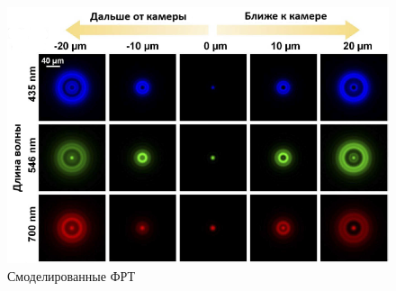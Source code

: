 \begin{figure}[ht] 
	\center
	\includegraphics [scale=0.8] {my_folder/images/PSF.png}
	\caption{Смоделированные ФРТ}
	\label{fig:PSF}
\end{figure}


%
